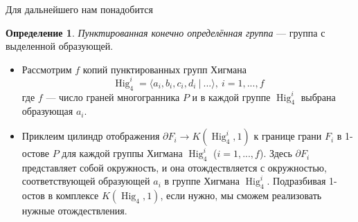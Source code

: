 \documentclass[14pt, dvipsnames, twoside]{extarticle}
\theoremstyle{definition}
\newtheorem{defi}{Определение}
\theoremstyle{remark}
\DeclareMathOperator{\Hig}{\mathrm{Hig}}
\begin{document}
Для дальнейшего нам понадобится

\begin{defi}
{\it Пунктированная конечно определённая группа} --- группа с выделенной образующей.
\end{defi}

\begin{itemize}


\item Рассмотрим $f$ копий пунктированных групп Хигмана $$\Hig^i_4 = \langle a_i, b_i, c_i, d_i\ | \ ... \rangle,\ i=1,..., f$$ где $f$ --- число граней многогранника $P$ и в каждой группе $\Hig^i_4$ выбрана образующая $a_i$.

\item Приклеим цилиндр отображения $\partial F_i → K (\Hig^i_4, 1)$ к границе грани $F_i$ в 1-остове $P$ для каждой группы Хигмана $\Hig^i_4$ ($i = 1, ..., f$). Здесь $\partial F_i$ представляет собой окружность, и она отождествляется с окружностью, соответствующей образующей $a_i$ в группе Хигмана $\Hig^i_4$. Подразбивая 1-остов в комплексе $K(\Hig_4, 1)$, если нужно, мы сможем реализовать нужные отождествления.

\end{itemize}
\end{document}

